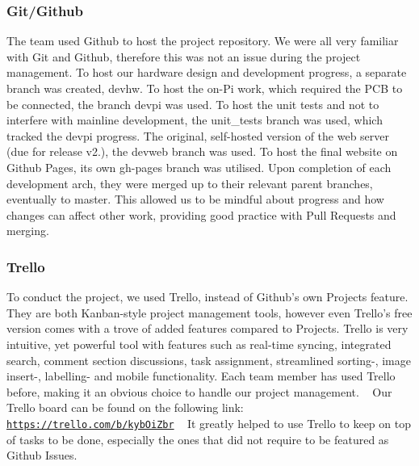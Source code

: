 \subsubsection*{Git/\+Github}

The team used Github to host the project repository. We were all very familiar with Git and Github, therefore this was not an issue during the project management. To host our hardware design and development progress, a separate branch was created, {\ttfamily devhw}. To host the on-\/\+Pi work, which required the P\+CB to be connected, the branch {\ttfamily devpi} was used. To host the unit tests and not to interfere with mainline development, the {\ttfamily unit\+\_\+tests} branch was used, which tracked the {\ttfamily devpi} progress. The original, self-\/hosted version of the web server (due for release v2.), the {\ttfamily devweb} branch was used. To host the final website on Github Pages, its own {\ttfamily gh-\/pages} branch was utilised. Upon completion of each development arch, they were merged up to their relevant parent branches, eventually to {\ttfamily master}. This allowed us to be mindful about progress and how changes can affect other work, providing good practice with {\ttfamily Pull Requests} and merging.

\subsubsection*{Trello}

To conduct the project, we used Trello, instead of Github’s own Projects feature. They are both Kanban-\/style project management tools, however even Trello’s free version comes with a trove of added features compared to Projects. Trello is very intuitive, yet powerful tool with features such as real-\/time syncing, integrated search, comment section discussions, task assignment, streamlined sorting-\/, image insert-\/, labelling-\/ and mobile functionality. Each team member has used Trello before, making it an obvious choice to handle our project management. ~\newline
 Our Trello board can be found on the following link\+: \href{https://trello.com/b/kybOiZbr}{\tt https\+://trello.\+com/b/kyb\+Oi\+Zbr} ~\newline
 It greatly helped to use Trello to keep on top of tasks to be done, especially the ones that did not require to be featured as Github Issues. 